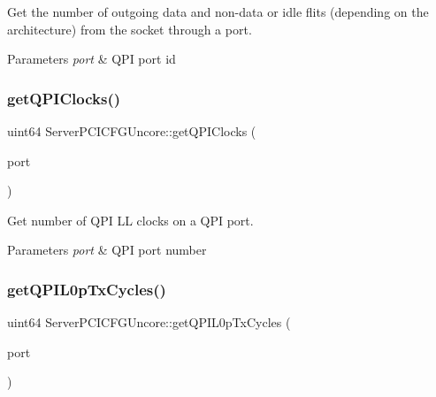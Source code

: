 Get the number of outgoing data and non-\/data or idle flits (depending on the architecture) from the socket through a port. 


\begin{DoxyParams}{Parameters}
{\em port} & Q\+PI port id \\
\hline
\end{DoxyParams}
\mbox{\label{class_server_p_c_i_c_f_g_uncore_ae5bc4e8e1003ed74fdd3c641e6ac78a5}} 
\subsubsection{\texorpdfstring{get\+Q\+P\+I\+Clocks()}{getQPIClocks()}}
{\footnotesize\ttfamily uint64 Server\+P\+C\+I\+C\+F\+G\+Uncore\+::get\+Q\+P\+I\+Clocks (\begin{DoxyParamCaption}\item[{uint32}]{port }\end{DoxyParamCaption})}



Get number of Q\+PI LL clocks on a Q\+PI port. 


\begin{DoxyParams}{Parameters}
{\em port} & Q\+PI port number \\
\hline
\end{DoxyParams}
\mbox{\label{class_server_p_c_i_c_f_g_uncore_a7aaff7ae03c8189de550215cef3b39f7}} 
\subsubsection{\texorpdfstring{get\+Q\+P\+I\+L0p\+Tx\+Cycles()}{getQPIL0pTxCycles()}}
{\footnotesize\ttfamily uint64 Server\+P\+C\+I\+C\+F\+G\+Uncore\+::get\+Q\+P\+I\+L0p\+Tx\+Cycles (\begin{DoxyParamCaption}\item[{uint32}]{port }\end{DoxyParamCaption})}



